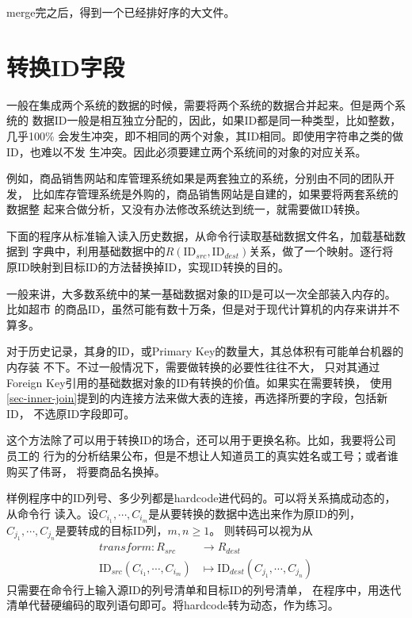 \documentclass[11pt]{article}
\begin{document}
merge完之后，得到一个已经排好序的大文件。

\section{转换ID字段} \label{sec-transform-id}
一般在集成两个系统的数据的时候，需要将两个系统的数据合并起来。但是两个系统的
数据ID一般是相互独立分配的，因此，如果ID都是同一种类型，比如整数，几乎100\%
会发生冲突，即不相同的两个对象，其ID相同。即使用字符串之类的做ID，也难以不发
生冲突。因此必须要建立两个系统间的对象的对应关系。

例如，商品销售网站和库管理系统如果是两套独立的系统，分别由不同的团队开发，
比如库存管理系统是外购的，商品销售网站是自建的，如果要将两套系统的数据整
起来合做分析，又没有办法修改系统达到统一，就需要做ID转换。

下面的程序从标准输入读入历史数据，从命令行读取基础数据文件名，加载基础数据到
字典中，利用基础数据中的$R(\mathrm{ID}_{src}, \mathrm{ID}_{dest})$关系，做了一个映射。逐行将
原ID映射到目标ID的方法替换掉ID，实现ID转换的目的。


一般来讲，大多数系统中的某一基础数据对象的ID是可以一次全部装入内存的。比如超市
的商品ID，虽然可能有数十万条，但是对于现代计算机的内存来讲并不算多。

对于历史记录，其身的ID，或Primary Key的数量大，其总体积有可能单台机器的内存装
不下。不过一般情况下，需要做转换的必要性往往不大，
只对其通过Foreign Key引用的基础数据对象的ID有转换的价值。如果实在需要转换，
使用\ref{sec-inner-join}提到的内连接方法来做大表的连接，再选择所要的字段，包括新ID，
不选原ID字段即可。

这个方法除了可以用于转换ID的场合，还可以用于更换名称。比如，我要将公司员工的
行为的分析结果公布，但是不想让人知道员工的真实姓名或工号；或者谁购买了伟哥，
将要商品名换掉。

样例程序中的ID列号、多少列都是hardcode进代码的。可以将关系搞成动态的，从命令行
读入。设$C_{i_1}, \cdots, C_{i_m}$是从要转换的数据中选出来作为原ID的列，
$C_{j_1}, \cdots, C_{j_n}$是要转成的目标ID列，$m, n \geqslant 1$。
则转码可以视为从
\begin{equation} \label{transform-id}
\begin{aligned} 
transform: R_{src} &\to R_{dest} \\
\mathrm{ID}_{src}(C_{i_1}, \cdots, C_{i_m}) &\mapsto \mathrm{ID}_{dest}(C_{j_1}, \cdots, C_{j_n}) 
\end{aligned} 
\end{equation}
只需要在命令行上输入源ID的列号清单和目标ID的列号清单，
在程序中，用迭代清单代替硬编码的取列语句即可。将hardcode转为动态，作为练习。
\end{document}
